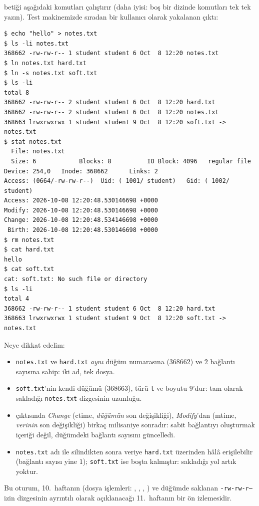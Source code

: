  betiği aşağıdaki komutları çalıştırır (daha iyisi: boş bir dizinde komutları tek tek yazın). Test makinemizde sıradan bir kullanıcı olarak yakalanan çıktı:

\begin{lstlisting}[style=term]
$ echo "hello" > notes.txt
$ ls -li notes.txt
368662 -rw-rw-r-- 1 student student 6 Oct  8 12:20 notes.txt
$ ln notes.txt hard.txt
$ ln -s notes.txt soft.txt
$ ls -li
total 8
368662 -rw-rw-r-- 2 student student 6 Oct  8 12:20 hard.txt
368662 -rw-rw-r-- 2 student student 6 Oct  8 12:20 notes.txt
368663 lrwxrwxrwx 1 student student 9 Oct  8 12:20 soft.txt -> notes.txt
$ stat notes.txt
  File: notes.txt
  Size: 6            Blocks: 8          IO Block: 4096   regular file
Device: 254,0   Inode: 368662      Links: 2
Access: (0664/-rw-rw-r--)  Uid: ( 1001/ student)   Gid: ( 1002/ student)
Access: 2026-10-08 12:20:48.530146698 +0000
Modify: 2026-10-08 12:20:48.530146698 +0000
Change: 2026-10-08 12:20:48.534146698 +0000
 Birth: 2026-10-08 12:20:48.530146698 +0000
$ rm notes.txt
$ cat hard.txt
hello
$ cat soft.txt
cat: soft.txt: No such file or directory
$ ls -li
total 4
368662 -rw-rw-r-- 1 student student 6 Oct  8 12:20 hard.txt
368663 lrwxrwxrwx 1 student student 9 Oct  8 12:20 soft.txt -> notes.txt
\end{lstlisting}

Neye dikkat edelim:
\begin{itemize}
  \item \texttt{notes.txt} ve \texttt{hard.txt} \emph{aynı} düğüm numarasına ($368662$) ve $2$ bağlantı sayısına sahip: iki ad, tek dosya.
  \item \texttt{soft.txt}'nin kendi düğümü ($368663$), türü \texttt{l} ve boyutu $9$'dur: tam olarak sakladığı \texttt{notes.txt} dizgesinin uzunluğu.
  \item {} çıktısında \emph{Change} (ctime, \emph{düğümün} son değişikliği), \emph{Modify}'dan (mtime, \emph{verinin} son değişikliği) birkaç milisaniye sonradır: sabit bağlantıyı oluşturmak içeriği değil, düğümdeki bağlantı sayısını güncelledi.
  \item \texttt{notes.txt} adı  ile silindikten sonra veriye \texttt{hard.txt} üzerinden hâlâ erişilebilir (bağlantı sayısı yine $1$); \texttt{soft.txt} ise boşta kalmıştır: sakladığı yol artık yoktur.
\end{itemize}
Bu oturum, 10.\ haftanın (dosya işlemleri: , , , ) ve düğümde saklanan \texttt{-rw-rw-r--} izin dizgesinin ayrıntılı olarak açıklanacağı 11.\ haftanın bir ön izlemesidir.

